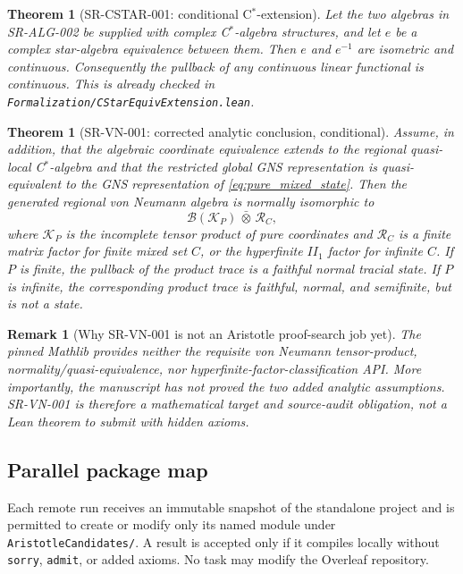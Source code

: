 \documentclass{article}
\newtheorem{theorem}[definition]{Theorem}
\newtheorem{remark}[definition]{Remark}
\newcommand{\cR}{\mathcal R}
\newcommand{\cB}{\mathcal B}
\begin{document}
\begin{theorem}[SR-CSTAR-001: conditional C\(^*\)-extension]
Let the two algebras in SR-ALG-002 be supplied with complex C\(^*\)-algebra
structures, and let \(e\) be a complex star-algebra equivalence between them.
Then \(e\) and \(e^{-1}\) are isometric and continuous.  Consequently the
pullback of any continuous linear functional is continuous.  This is already
checked in \texttt{Formalization/CStarEquivExtension.lean}.
\end{theorem}

\begin{theorem}[SR-VN-001: corrected analytic conclusion, conditional]
Assume, in addition, that the algebraic coordinate equivalence extends to the
regional quasi-local C\(^*\)-algebra and that the restricted global GNS
representation is quasi-equivalent to the GNS representation of
\eqref{eq:pure_mixed_state}.  Then the generated regional von Neumann algebra
is normally isomorphic to
\begin{equation}
 \cB(\mathcal K_P)\,\bar\otimes\,\cR_C,
 \label{eq:regional_von_neumann_target}
\end{equation}
where \(\mathcal K_P\) is the incomplete tensor product of pure coordinates
and \(\cR_C\) is a finite matrix factor for finite mixed set \(C\), or the
hyperfinite \(II_1\) factor for infinite \(C\).  If \(P\) is finite, the
pullback of the product trace is a faithful normal tracial state.  If \(P\)
is infinite, the corresponding product trace is faithful, normal, and
semifinite, but is not a state.
\end{theorem}

\begin{remark}[Why SR-VN-001 is not an Aristotle proof-search job yet]
The pinned Mathlib provides neither the requisite von Neumann tensor-product,
normality/quasi-equivalence, nor hyperfinite-factor-classification API.  More
importantly, the manuscript has not proved the two added analytic assumptions.
SR-VN-001 is therefore a mathematical target and source-audit obligation, not
a Lean theorem to submit with hidden axioms.
\end{remark}

\subsection*{Parallel package map}

Each remote run receives an immutable snapshot of the standalone project and
is permitted to create or modify only its named module under
\texttt{AristotleCandidates/}.  A result is accepted only if it compiles
locally without \texttt{sorry}, \texttt{admit}, or added axioms.  No task may
modify the Overleaf repository.
\end{document}
